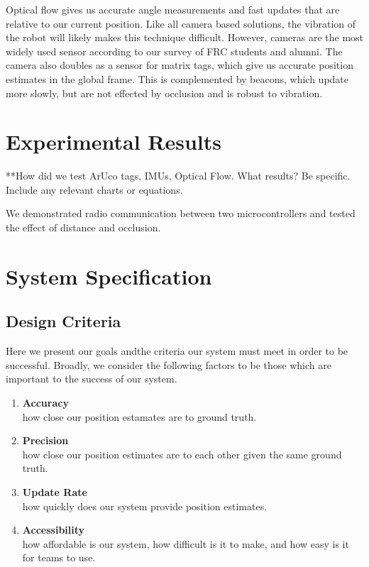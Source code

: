 \documentclass{article}
\begin{document}
Optical flow gives us accurate angle measurements and fast updates that are relative to our current position. Like all camera based solutions, the vibration of the robot will likely makes this technique difficult. However, cameras are the most widely used sensor according to our survey of FRC students and alumni.
The camera also doubles as a sensor for matrix tags, which give us accurate position estimates in the global frame. This is complemented by beacons, which update more slowly, but are not effected by occlusion and is robust to vibration.

\section{Experimental Results} \label{experiments}

**How did we test ArUco tags, IMUs, Optical Flow. What results? Be specific. Include any relevant charts or equations.

We demonstrated radio communication between two microcontrollers and tested the effect of distance and occlusion.

\section{System Specification} \label{specs}

\subsection{Design Criteria}

Here we present our goals andthe criteria our system must meet in order to be successful. Broadly, we consider the following factors to be those which are important to the success of our system.
\begin{enumerate}
  \item \textbf{Accuracy}\\ how close our position estamates are to ground truth.
  \item \textbf{Precision}\\ how close our position estimates are to each other given the same ground truth.
  \item \textbf{Update Rate}\\ how quickly does our system provide position estimates.
  \item \textbf{Accessibility}\\ how affordable is our system, how difficult is it to make, and how easy is it for teams to use.
\end{enumerate}
\end{document}
